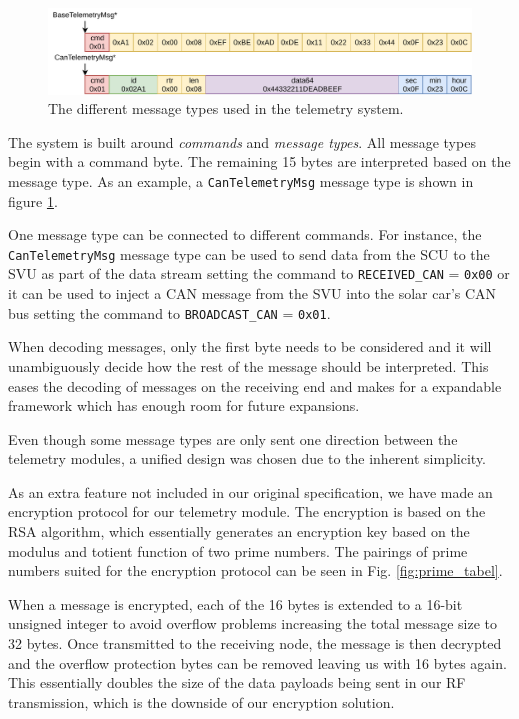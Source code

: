 \documentclass[conference]{IEEEtran}
\begin{document}
\begin{figure}
    \centering
    \includegraphics[width=\linewidth]{documentation/images/MessageTypes.pdf}
    \caption{The different message types used in the telemetry system.}
    \label{fig:messageTypes}
\end{figure}

The system is built around \textit{commands} and \textit{message types}. All message types begin with a command byte. The remaining 15 bytes are interpreted based on the message type. As an example, a \texttt{CanTelemetryMsg} message type is shown in figure \ref{fig:messageTypes}. 

One message type can be connected to different commands. For instance, the \texttt{CanTelemetryMsg} message type can be used to send data from the SCU to the SVU as part of the data stream setting the command to \texttt{RECEIVED\_CAN} = \texttt{0x00} or it can be used to inject a CAN message from the SVU into the solar car's CAN bus setting the command to \texttt{BROADCAST\_CAN} = \texttt{0x01}. 

When decoding messages, only the first byte needs to be considered and it will unambiguously decide how the rest of the message should be interpreted. This eases the decoding of messages on the receiving end and makes for a expandable framework which has enough room for future expansions. 

Even though some message types are only sent one direction between the telemetry modules, a unified design was chosen due to the inherent simplicity.

As an extra feature not included in our original specification, we have made an encryption protocol for our telemetry module. The encryption is based on the RSA algorithm, which essentially generates an encryption key based on the modulus and totient function of two prime numbers. The pairings of prime numbers suited for the encryption protocol can be seen in Fig. \ref{fig:prime_tabel}. 

When a message is encrypted, each of the 16 bytes is extended to a 16-bit unsigned integer to avoid overflow problems increasing the total message size to 32 bytes. Once transmitted to the receiving node, the message is then decrypted and the overflow protection bytes can be removed leaving us with 16 bytes again. This essentially doubles the size of the data payloads being sent in our RF transmission, which is the downside of our encryption solution.
\end{document}
